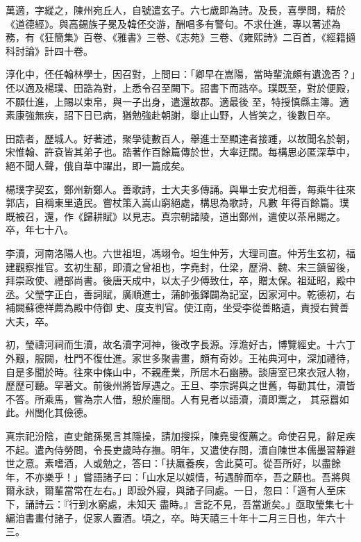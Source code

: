 \begin{pinyinscope}
 萬適，字縱之，陳州宛丘人，自號遣玄子。六七歲即為詩。及長，喜學問，精於《道德經》。與高錫族子冕及韓伾交游，酬唱多有警句。不求仕進，專以著述為務，有《狂簡集》百卷、《雅書》三卷、《志苑》三卷、《雍熙詩》二百首，《經籍擿科討論》計四十卷。



 淳化中，伾任翰林學士，因召對，上問曰：「卿早在嵩陽，當時輩流頗有遺逸否？」伾以適及楊璞、田誥為對，上悉令召至闕下。詔書下而誥卒。璞既至，對於便殿，不願仕進，上賜以束帛，與一子出身，遣還故郡。適最後
 至，特授慎縣主簿。適素康強無疾，詔下日已病，猶勉強赴朝謝，舉止山野，人皆笑之，後數日卒。



 田誥者，歷城人。好著述，聚學徒數百人，舉進士至顯達者接踵，以故聞名於朝，宋惟翰、許袞皆其弟子也。誥著作百餘篇傳於世，大率迂闊。每構思必匿深草中，絕不聞人聲，俄自草中躍出，即一篇成矣。



 楊璞字契玄，鄭州新鄭人。善歌詩，士大夫多傳誦。與畢士安尤相善，每乘牛往來郭店，自稱東里遺民。嘗杖策入嵩山窮絕處，構思為歌詩，凡數
 年得百餘篇。璞既被召，還，作《歸耕賦》以見志。真宗朝諸陵，道出鄭州，遣使以茶帛賜之。卒，年七十八。



 李瀆，河南洛陽人也。六世祖坦，馮翊令。坦生仲芳，大理司直。仲芳生玄初，福建觀察推官。玄初生鄑，即瀆之曾祖也，字堯封，仕梁，歷滑、魏、宋三鎮留後，拜崇政使、禮部尚書。後唐天成中，以太子少傅致仕，卒，贈太保。祖延昭，殿中丞。父瑩字正白，善詞賦，廣順進士，蒲帥張鐸闢為記室，因家河中。乾德初，右補闕蘇德祥薦為殿中侍御
 史、度支判官。使江南，坐受李從善賂遺，責授右贊善大夫，卒。



 初，瑩禱河祠而生瀆，故名瀆字河神，後改字長源。淳澹好古，博覽經史。十六丁外艱，服闕，杜門不復仕進。家世多聚書畫，頗有奇妙。王祐典河中，深加禮待，自是多聞於時。往來中條山中，不親產業，所居木石幽勝。談唐室已來衣冠人物，歷歷可聽。罕著文。前後州將皆厚遇之。王旦、李宗諤與之世舊，每勸其仕，瀆皆不答。所乘馬，嘗為宗人借，憩於廛間。人有見者以語瀆，瀆即鬻之，
 其惡囂如此。州閭化其儉德。



 真宗祀汾陰，直史館孫冕言其隱操，請加搜採，陳堯叟復薦之。命使召見，辭足疾不起。遣內侍勞問，令長吏歲時存撫。明年，又遣使存問，瀆自陳世本儒墨習靜避世之意。素嗜酒，人或勉之，答曰：「扶羸養疾，舍此莫可。從吾所好，以盡餘年，不亦樂乎！」嘗語諸子曰：「山水足以娛情，茍遇醉而卒，吾之願也。吾將與爾永訣，爾輩當常在左右。」即設外寢，與諸子同處。一日，忽曰：「適有人至床下，誦詩云：『行到水窮處，未知天
 盡時。』言訖不見，吾當逝矣。」亟取瑩集七十編洎書畫付諸子，促家人置酒。頃之，卒。時天禧三十年十二月三日也，年六十三。




\end{pinyinscope}
